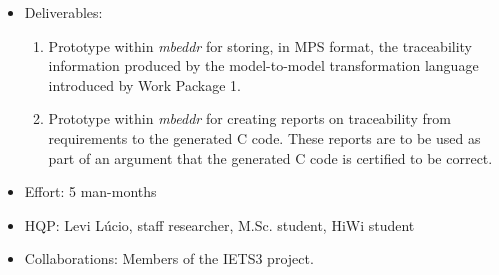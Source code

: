 \begin{itemize}
  \item Deliverables:
  \begin{enumerate}
    \item Prototype within \emph{mbeddr} for storing, in MPS format, the
    traceability information produced by the model-to-model transformation
    language introduced by Work Package 1.
    \item Prototype within \emph{mbeddr} for creating reports on traceability
    from requirements to the generated C code. These reports are to be used as
    part of an argument that the generated C code is certified to be correct.
  \end{enumerate}
  \item Effort: 5 man-months
  \item HQP: Levi L\'ucio, staff researcher, M.Sc. student, HiWi student 
  \item Collaborations: Members of the IETS3 project.
\end{itemize}
